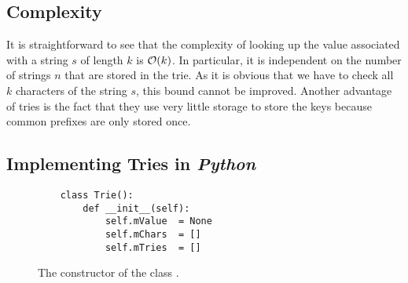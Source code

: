 \subsection{Complexity}
It is straightforward to see that the complexity of looking up the value associated with a string
$s$ of length $k$ is $\mathcal{O}(k)$.  In particular, it is independent on the number of strings $n$ that are stored in
the trie.
As it is obvious that we have to check all $k$ characters of the string $s$, this bound cannot be
improved.   Another advantage of tries is the fact that they use very little storage to store the
keys because common prefixes are only stored once. 

\subsection{Implementing Tries in \textsl{Python}}
\begin{figure}[!ht]
\centering
\begin{verbatim}
    class Trie(): 
        def __init__(self):
            self.mValue  = None
            self.mChars  = []
            self.mTries  = []
\end{verbatim}
\vspace*{-0.3cm}
\caption{The constructor of the class .}
\label{fig:trie.ipython-outline}
\end{figure}

